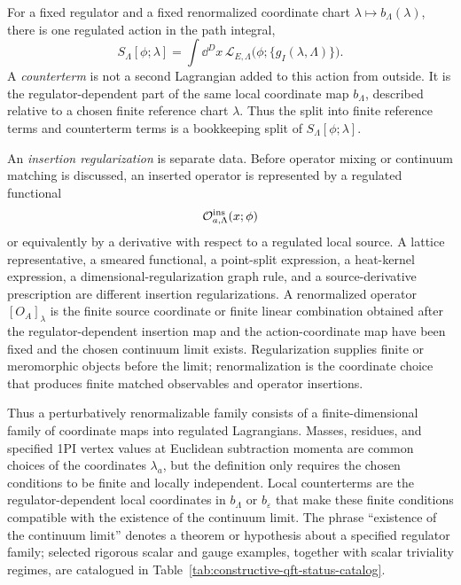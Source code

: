\begin{definition}
\label{def:counterterm-and-insertion-regularization}
For a fixed regulator and a fixed renormalized coordinate chart
\(\lambda\mapsto b_\Lambda(\lambda)\), there is one regulated action in the
path integral,
\[
  S_\Lambda[\phi;\lambda]
  =
  \int\dd^Dx\,\mathcal L_{E,\Lambda}
       \bigl(\phi;\{g_I(\lambda,\Lambda)\}\bigr).
\]
A \emph{counterterm} is not a second Lagrangian added to this action from
outside.  It is the regulator-dependent part of the same local coordinate map
\(b_\Lambda\), described relative to a chosen finite reference chart
\(\lambda\).  Thus the split into finite reference terms and counterterm
terms is a bookkeeping split of \(S_\Lambda[\phi;\lambda]\).

An \emph{insertion regularization} is separate data.  Before operator mixing
or continuum matching is discussed, an inserted operator is represented by a
regulated functional
\[
  \mathcal O_{a,\Lambda}^{\rm ins}(x;\phi)
\]
or equivalently by a derivative with respect to a regulated local source.  A
lattice representative, a smeared functional, a point-split expression, a
heat-kernel expression, a dimensional-regularization graph rule, and a
source-derivative prescription are different insertion regularizations.  A
renormalized operator \([O_A]_\lambda\) is the finite source coordinate or
finite linear combination obtained after the regulator-dependent insertion
map and the action-coordinate map have been fixed and the chosen continuum
limit exists.  Regularization supplies finite or meromorphic objects before
the limit; renormalization is the coordinate choice that produces finite
matched observables and operator insertions.
\end{definition}

Thus a perturbatively renormalizable family consists of a finite-dimensional
family of coordinate maps into regulated Lagrangians.  Masses, residues, and
specified 1PI vertex values at Euclidean subtraction momenta are common choices
of the coordinates \(\lambda_a\), but the definition only requires the chosen
conditions to be finite and locally independent.  Local counterterms are the
regulator-dependent local coordinates in \(b_{\Lambda}\) or
\(b_{\varepsilon}\) that make these finite conditions compatible with the
existence of the continuum limit.  The phrase ``existence of the continuum
limit'' denotes a theorem or hypothesis about a specified regulator family;
selected rigorous scalar and gauge examples, together with scalar triviality
regimes, are catalogued in
Table~\ref{tab:constructive-qft-status-catalog}.

